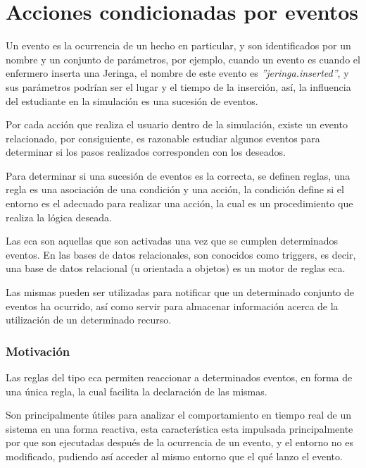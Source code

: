 

\section{Acciones condicionadas por eventos}

Un evento es la ocurrencia de un hecho en particular, y son identificados por un
nombre y un conjunto de parámetros, por ejemplo, cuando un evento es cuando el
enfermero inserta una Jeringa, el nombre de este evento es
\emph{''jeringa.inserted''}, y sus parámetros podrían ser el lugar y el tiempo
de la inserción, así, la influencia del estudiante en la simulación es una
sucesión de eventos.

Por cada acción que realiza el usuario dentro de la simulación, existe un evento
relacionado, por consiguiente, es razonable estudiar algunos eventos para
determinar si los pasos realizados corresponden con los deseados. 

Para determinar si una sucesión de eventos es la correcta, se definen reglas,
una regla es una asociación de una condición y una acción, la condición define
si el entorno es el adecuado para realizar una acción, la cual es un
procedimiento que realiza la lógica deseada.

Las \gls{eca} son aquellas que son activadas una vez que se cumplen determinados
eventos\cite{bailey2004event}. En las bases de datos relacionales, son conocidos
como triggers, es decir, una base de datos relacional (u orientada a objetos) es
un motor de reglas \gls{eca}\cite{bailey2004event}\cite{behrends2006combining}.

Las mismas pueden ser utilizadas para notificar que un determinado conjunto de
eventos ha ocurrido\cite{bailey2004event}, así como servir para almacenar
información acerca de la utilización de un determinado recurso.


\subsubsection{Motivación}

Las reglas del tipo \gls{eca} permiten reaccionar a determinados eventos, en
forma de una única regla, la cual facilita la declaración de las
mismas\cite{bailey2004event}.

Son principalmente útiles para analizar el comportamiento en tiempo real de un
sistema en una forma
reactiva\cite{bailey2004event}\cite{de2001eca}\cite{bailey2002analysis}, esta
característica esta impulsada principalmente por que son ejecutadas después de
la ocurrencia de un evento, y el entorno no es modificado, pudiendo así acceder
al mismo entorno que el qué lanzo el evento.

